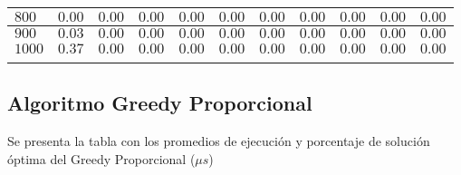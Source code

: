 \documentclass[12pt]{article}
\begin{document}
\begin{tabu}{|@{}*{11}{p{1.4cm}@{}|}}
$800$ & $0.00$ & $0.00$ & $0.00$ & $0.00$ & $0.00$ & $0.00$ & $0.00$ & $0.00$ & $0.00$ & $0.00$ \\\hline
$900$ & $0.03$ & $0.00$ & $0.00$ & $0.00$ & $0.00$ & $0.00$ & $0.00$ & $0.00$ & $0.00$ & $0.00$ \\\hline
$1000$ & $0.37$ & $0.00$ & $0.00$ & $0.00$ & $0.00$ & $0.00$ & $0.00$ & $0.00$ & $0.00$ & $0.00$ \\\hline
{}%
\end{tabu}
\pagebreak
\subsection*{Algoritmo Greedy Proporcional}
Se presenta la tabla con los promedios de ejecuci\'on y porcentaje de soluci\'on \'optima del Greedy Proporcional ($\mu s$)\\
\end{document}
